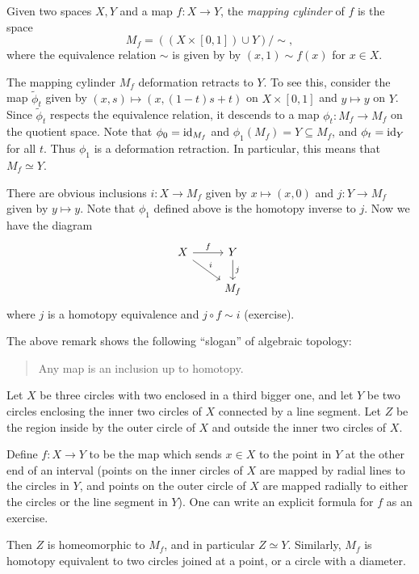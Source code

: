 \begin{definition}
  Given two spaces $X, Y$ and a map $f : X \to Y$,
  the \emph{mapping cylinder} of $f$ is the space
  \[
    M_f = ((X \times [0, 1]) \cup Y) / {\sim},
  \]
  where the equivalence relation $\sim$ is given by
  by $(x, 1) \sim f(x)$ for $x \in X$.
\end{definition}

\begin{remark}
  The mapping cylinder $M_f$ deformation retracts to $Y$.
  To see this, consider the map $\widetilde{\phi}_t$
  given by
  $(x, s) \mapsto (x, (1 - t)s + t)$ on
  $X \times [0, 1]$ and $y \mapsto y$ on $Y$. Since
  $\widetilde{\phi}_t$ respects the equivalence
  relation, it descends to a map $\phi_t : M_f \to M_f$
  on the quotient space. Note that
  $\phi_0 = \operatorname{id}_{M_f}$ and $\phi_1(M_f) = Y \subseteq M_f$,
  and $\phi_t = \operatorname{id}_Y$ for all $t$. Thus $\phi_1$ is a
  deformation retraction. In particular,
  this means that $M_f \simeq Y$.
\end{remark}

\begin{remark}
  There are obvious inclusions
  $i : X \to M_f$ given by $x \mapsto (x, 0)$
  and $j : Y \to M_f$ given by $y \mapsto y$.
  Note that $\phi_1$ defined above is the homotopy
  inverse to $j$. Now we have the diagram
  \[
    \begin{tikzcd}
      X \ar[r, "f"] \ar[dr, "i"] & Y \ar[d, "j"] \\
      & M_f
    \end{tikzcd}
  \]
  where $j$ is a homotopy equivalence and
  $j \circ f \sim i$ (exercise).
\end{remark}

\begin{remark}
  The above remark shows the following ``slogan''
  of algebraic topology:
  \begin{quote}
    Any map is an inclusion up to homotopy.
  \end{quote}
\end{remark}

\begin{example}
  Let $X$ be three circles with two enclosed in a third
  bigger one, and let $Y$ be two circles enclosing the
  inner two circles of $X$
  connected by a line segment. Let $Z$ be the region
  inside by the outer circle of $X$ and outside
  the inner two circles of $X$.

  Define $f : X \to Y$
  to be the map which sends $x \in X$ to the point in
  $Y$ at the other end of an interval (points on the
  inner circles of $X$ are mapped by radial lines to the
  circles in $Y$, and points on the outer circle of $X$
  are mapped radially to either the circles or
  the line segment in $Y$). One can write an explicit
  formula for $f$ as an exercise.

  Then $Z$ is homeomorphic to $M_f$, and in particular
  $Z \simeq Y$. Similarly, $M_f$ is homotopy equivalent
  to two circles joined at a point, or a circle
  with a diameter.
\end{example}
